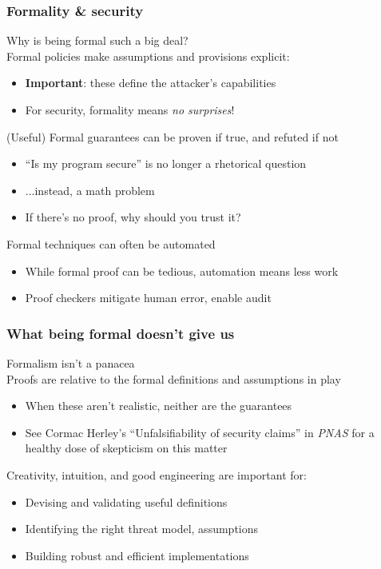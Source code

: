 \documentclass[10pt,handout]{beamer}
\begin{document}

\begin{frame}

\frametitle{Formality \& security}

Why is being formal such a big deal?
\\[1em]

Formal policies make assumptions and provisions explicit:
\begin{itemize}
  \item \textbf{Important}: these define the attacker's capabilities
  \item For security, formality means \emph{no surprises}! \\[1em]
\end{itemize}

(Useful) Formal guarantees can be proven if true, and refuted if not
\begin{itemize}
  \item ``Is my program secure'' is no longer a rhetorical question
  \item ...instead, a math problem
  \item If there's no proof, why should you trust it? \\[1em]
\end{itemize}

Formal techniques can often be automated
\begin{itemize}
  \item While formal proof can be tedious, automation means less work
  \item Proof checkers mitigate human error, enable audit
\end{itemize}

\end{frame}


\begin{frame}

\frametitle{What being formal doesn't give us}

Formalism isn't a panacea
\\[1em]

\pause
Proofs are relative to the formal definitions and assumptions in play
\begin{itemize}
  \item When these aren't realistic, neither are the guarantees
  \item See Cormac Herley's ``Unfalsifiability of security claims'' in \emph{PNAS} for a healthy dose of skepticism on this matter \\[1em]
\end{itemize}

\pause
Creativity, intuition, and good engineering are important for:
\begin{itemize}
  \item Devising and validating useful definitions
  \item Identifying the right threat model, assumptions
  \item Building robust and efficient implementations
\end{itemize}

\end{frame}
\end{document}
